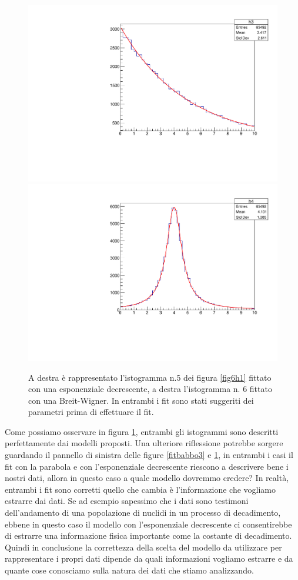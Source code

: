 \documentclass[11pt,fleqn]{book} %
\begin{document}
\begin{figure}[h]
\centering
\includegraphics[scale=0.35]{Pictures/fitexpgiusta.pdf}
\includegraphics[scale=0.35]{Pictures/fitebwsgiusta.pdf}
\caption{A destra è rappresentato l'istogramma n.5 dei figura \ref{fig6h1} fittato con una esponenziale decrescente, a destra l'istogramma n. 6 fittato con una Breit-Wigner. In entrambi i fit sono stati suggeriti dei parametri prima di effettuare il fit. \label{fitbabbo4}}
\end{figure}
Come possiamo osservare in figura \ref{fitbabbo4}, entrambi gli istogrammi sono descritti perfettamente dai modelli proposti.
Una ulteriore riflessione potrebbe sorgere guardando il pannello di sinistra delle figure \ref{fitbabbo3} e \ref{fitbabbo4}, in entrambi i casi il fit con la parabola e con l'esponenziale decrescente riescono a descrivere bene i nostri dati, allora in questo caso a quale modello dovremmo credere? In realtà, entrambi i fit sono corretti quello che cambia è l'informazione che vogliamo estrarre dai dati. Se ad esempio sapessimo che i dati sono testimoni dell'andamento di una popolazione di nuclidi in un processo di decadimento, ebbene in questo caso il modello con l'esponenziale decrescente ci consentirebbe di estrarre una informazione fisica importante come la costante di decadimento. Quindi in conclusione la correttezza della scelta del modello da utilizzare per rappresentare i propri dati dipende da quali informazioni vogliamo estrarre e da quante cose conosciamo sulla natura dei dati che stiamo analizzando.
\end{document}
